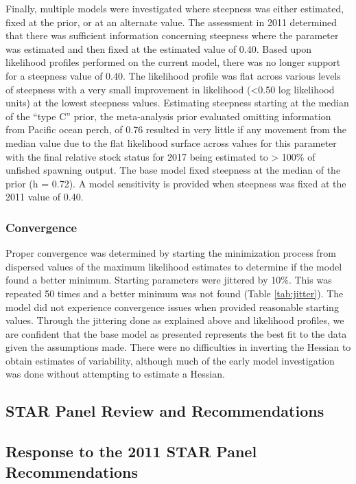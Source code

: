 \documentclass[12pt,]{article}
\begin{document}
Finally, multiple models were investigated where steepness was either
estimated, fixed at the prior, or at an alternate value. The assessment
in 2011 determined that there was sufficient information concerning
steepness where the parameter was estimated and then fixed at the
estimated value of 0.40. Based upon likelihood profiles performed on the
current model, there was no longer support for a steepness value of
0.40. The likelihood profile was flat across various levels of steepness
with a very small improvement in likelihood (\textless{}0.50 log
likelihood units) at the lowest steepness values. Estimating steepness
starting at the median of the ``type C'' prior, the meta-analysis prior
evaluated omitting information from Pacific ocean perch, of 0.76
resulted in very little if any movement from the median value due to the
flat likelihood surface across values for this parameter with the final
relative stock status for 2017 being estimated to \textgreater{} 100\%
of unfished spawning output. The base model fixed steepness at the
median of the prior (h = 0.72). A model sensitivity is provided when
steepness was fixed at the 2011 value of 0.40.

\subsubsection{Convergence}\label{convergence}

Proper convergence was determined by starting the minimization process
from dispersed values of the maximum likelihood estimates to determine
if the model found a better minimum. Starting parameters were jittered
by 10\%. This was repeated 50 times and a better minimum was not found
(Table \ref{tab:jitter}). The model did not experience convergence
issues when provided reasonable starting values. Through the jittering
done as explained above and likelihood profiles, we are confident that
the base model as presented represents the best fit to the data given
the assumptions made. There were no difficulties in inverting the
Hessian to obtain estimates of variability, although much of the early
model investigation was done without attempting to estimate a Hessian.

\subsection{STAR Panel Review and
Recommendations}\label{star-panel-review-and-recommendations}

\subsection{Response to the 2011 STAR Panel
Recommendations}\label{response-to-the-2011-star-panel-recommendations}
\end{document}
